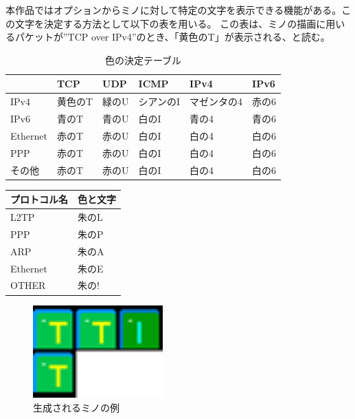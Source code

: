 \documentclass[11pt,a4paper]{jsarticle}
\begin{document}
本作品ではオプションからミノに対して特定の文字を表示できる機能がある。この文字を決定する方法として以下の表を用いる。
この表は、ミノの描画に用いるパケットが''TCP over IPv4''のとき、「黄色のT」が表示される、と読む。

\begin{table}[htbp]
\begin{center}
\caption{色の決定テーブル}
\begin{tabular}{|l|l|l|l|l|l|}
\hline
 & TCP & UDP & ICMP & IPv4 & IPv6 \\ \hline \hline
IPv4 & 黄色のT & 緑のU & シアンのI & マゼンタの4 & 赤の6 \\ \hline
IPv6 & 青のT & 青のU & 白のI & 青の4 & 青の6 \\ \hline
Ethernet & 赤のT & 赤のU & 白のI & 白の4 & 白の6 \\ \hline
PPP & 赤のT & 赤のU & 白のI & 白の4 & 白の6 \\ \hline
その他 & 赤のT & 赤のU & 白のI & 白の4 & 白の6 \\ \hline
\end{tabular}
\end{center}
\end{table}

\begin{table}[htbp]
\begin{center}
\begin{tabular}{|l|l|}
\hline
プロトコル名 & 色と文字 \\ \hline \hline
 L2TP & 朱のL \\ \hline
 PPP & 朱のP \\ \hline
 ARP & 朱のA \\ \hline
 Ethernet & 朱のE \\ \hline
 OTHER & 朱の! \\ \hline
\end{tabular}
\end{center}
\end{table}

\begin{figure}[htbp]
\centering
\includegraphics[width=5cm]{mino.png}
\caption{生成されるミノの例}
\end{figure}
\end{document}
